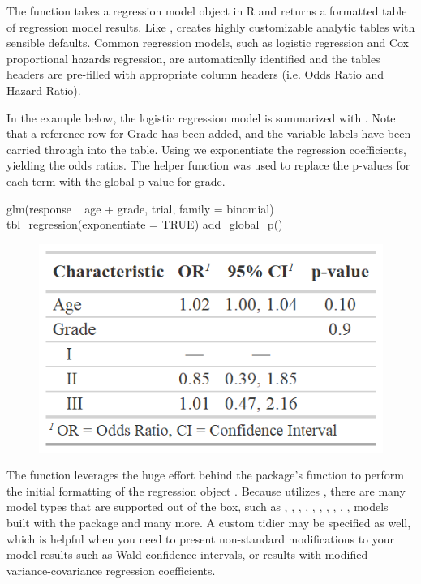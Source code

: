 The  function takes a regression model object in R and returns a formatted table of regression model results. 
Like ,  creates highly customizable analytic tables with sensible defaults.
Common regression models, such as logistic regression and Cox proportional hazards regression, are automatically identified and the tables headers are pre-filled with appropriate column headers (i.e. Odds Ratio and Hazard Ratio).

In the example below, the logistic regression model is summarized with .
Note that a reference row for Grade has been added, and the variable labels have been carried through into the table.
Using   we exponentiate the regression coefficients, yielding the odds ratios.
The helper function  was used to replace the p-values for each term with the global p-value for grade.

\begin{example}
glm(response ~ age + grade, trial, family = binomial) %
  tbl_regression(exponentiate = TRUE) %
  add_global_p()
\end{example}

\begin{figure}[h!]
  \includegraphics[scale=0.49]{regression.png}
  \centering
\end{figure}

The  function leverages the huge effort behind the  package's  function to perform the initial formatting of the regression object \citep{broom}.
Because  utilizes , there are many model types that are supported out of the box, such as , , , , , , , , , , models built with the  package \citep{mice} and many more. 
A custom tidier may be specified as well, which is helpful when you need to present non-standard modifications to your model results such as Wald confidence intervals, or results with modified variance-covariance regression coefficients.

